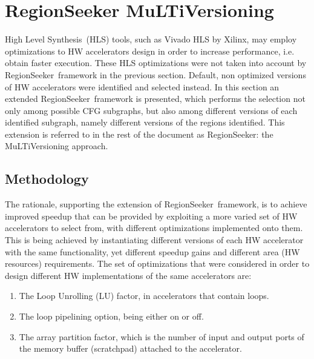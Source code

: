 \documentclass[]{usiinfthesis}
\newcommand{\rseeker}{{RegionSeeker}}
\newcommand{\HLS}{{High Level Synthesis}}
\begin{document}
%
%
%
%

\newpage
%
%
%
%
%
%
\section{RegionSeeker MuLTiVersioning}

\HLS\ (HLS) tools, such as Vivado HLS by Xilinx, may employ %
optimizations to HW accelerators
design in order to increase performance, i.e. obtain faster execution. These 
HLS optimizations were not taken into account by \rseeker\ framework in the
previous section. Default, non optimized versions of HW accelerators were identified
and selected instead. In this
section an extended \rseeker\ framework is presented, which performs the selection not 
only among possible CFG subgraphs, but also among different versions of each identified 
subgraph, namely different versions of the regions identified. 
This extension is referred to in the rest of the document as RegionSeeker: the 
MuLTiVersioning approach.


\subsection{Methodology}
\label{subsec:mv_meth}

The rationale, supporting the extension of \rseeker\ framework, is to achieve improved
speedup that can be provided by exploiting a more varied set of HW accelerators to select from, 
with different optimizations implemented onto them. This is being achieved by instantiating 
different versions of each HW accelerator with the same functionality, yet different speedup gains 
and different area (HW resources) requirements. The set of optimizations that were considered in 
order to design different HW implementations of the same accelerators are: 
\begin{enumerate}
\item The Loop Unrolling 
(LU) factor, in accelerators that contain loops.
\item The loop pipelining option, being either on or off.
\item The array partition factor, 
which is the number of input and output ports of the memory buffer (scratchpad) attached 
to the accelerator.
\end{enumerate}\par
\end{document}

